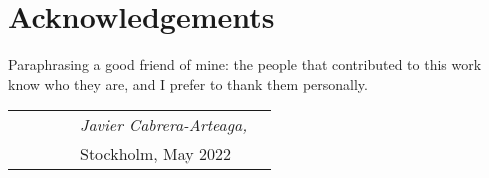 \section*{Acknowledgements}

Paraphrasing a good friend of mine: the people that contributed to this work know who they are, and I prefer to thank them personally.



\begin{table}[hb]
\begin{tabular}{lp{6.67cm}llll}
& & & & \textit{Javier Cabrera-Arteaga,} \\
& & & & Stockholm, May 2022
\end{tabular}
\end{table}





